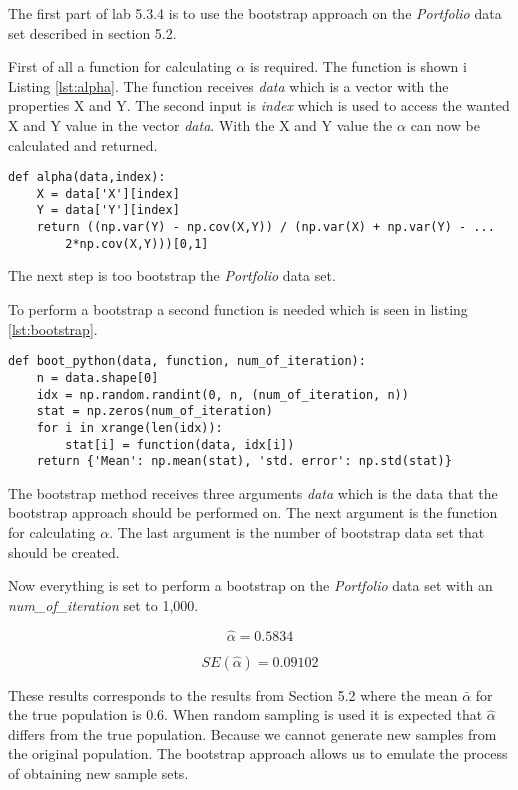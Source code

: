 The first part of lab 5.3.4 is to use the bootstrap approach on the \emph{Portfolio} data set described in section 5.2\citep{ISLR}.

First of all a function for calculating $\alpha$ is required. The function is shown i Listing \ref{lst:alpha}. The function receives \emph{data} which is a vector with the properties X and Y. The second input is \emph{index} which is used to access the wanted X and Y value in the vector \emph{data}.
With the X and Y value the $\alpha$ can now be calculated and returned.

\begin{lstlisting}[caption={Function for calculating $\alpha$ in python}, label=lst:alpha, mathescape=true]
def alpha(data,index):
	X = data['X'][index]
	Y = data['Y'][index]
	return ((np.var(Y) - np.cov(X,Y)) / (np.var(X) + np.var(Y) - ...
		2*np.cov(X,Y)))[0,1]
\end{lstlisting}

The next step is too bootstrap the \emph{Portfolio} data set.

To perform a bootstrap a second function is needed which is seen in listing \ref{lst:bootstrap}.

\begin{lstlisting}[caption={Bootstrap function in python}, label=lst:bootstrap, mathescape=true]
def boot_python(data, function, num_of_iteration):
	n = data.shape[0]
	idx = np.random.randint(0, n, (num_of_iteration, n))
	stat = np.zeros(num_of_iteration)
	for i in xrange(len(idx)):
		stat[i] = function(data, idx[i])
	return {'Mean': np.mean(stat), 'std. error': np.std(stat)}
\end{lstlisting}

The bootstrap method receives three arguments \emph{data} which is the data that the bootstrap approach should be performed on. The next argument is the function for calculating $\alpha$. The last argument is the number of bootstrap data set that should be created.  

Now everything is set to perform a bootstrap on the \emph{Portfolio} data set with an \emph{num\_of\_iteration} set to 1,000.

\begin{equation}
\hat{\alpha} = 0.5834
\end{equation}

\begin{equation}
SE(\hat{\alpha}) = 0.09102
\end{equation}

These results corresponds to the results from Section 5.2\citep{ISLR} where the mean $\bar{\alpha}$ for the true population is 0.6. When  random sampling is used it is expected that $\hat{\alpha}$ differs from the true population. Because we cannot generate new samples from the original population. The bootstrap approach allows us to emulate the process of obtaining new sample sets.

